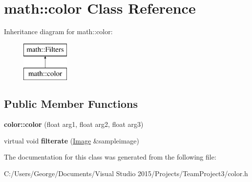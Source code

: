 \hypertarget{classmath_1_1color}{}\section{math\+:\+:color Class Reference}
\label{classmath_1_1color}
Inheritance diagram for math\+:\+:color\+:\begin{figure}[H]
\begin{center}
\leavevmode
\includegraphics[height=2.000000cm]{classmath_1_1color}
\end{center}
\end{figure}
\subsection*{Public Member Functions}
\begin{DoxyCompactItemize}
\item 
\mbox{\label{classmath_1_1color_a75daa37436356e0dc33c5d12ea955df3}} 
{\bfseries color\+::color} (float arg1, float arg2, float arg3)
\item 
\mbox{\label{classmath_1_1color_a8277acf72231494e2d513267d82cb003}} 
virtual void {\bfseries filterate} (\hyperlink{classmath_1_1_image}{Image} \&sampleimage)
\end{DoxyCompactItemize}


The documentation for this class was generated from the following file\+:\begin{DoxyCompactItemize}
\item 
C\+:/\+Users/\+George/\+Documents/\+Visual Studio 2015/\+Projects/\+Team\+Project3/color.\+h\end{DoxyCompactItemize}
